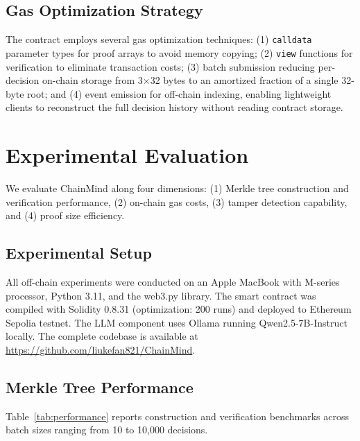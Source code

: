 \documentclass[manuscript,nonacm]{acmart}
\begin{document}
\subsection{Gas Optimization Strategy}

The contract employs several gas optimization techniques: (1) \texttt{calldata} parameter types for proof arrays to avoid memory copying; (2) \texttt{view} functions for verification to eliminate transaction costs; (3) batch submission reducing per-decision on-chain storage from 3$\times$32 bytes to an amortized fraction of a single 32-byte root; and (4) event emission for off-chain indexing, enabling lightweight clients to reconstruct the full decision history without reading contract storage.


\section{Experimental Evaluation}
\label{sec:evaluation}

We evaluate ChainMind along four dimensions: (1) Merkle tree construction and verification performance, (2) on-chain gas costs, (3) tamper detection capability, and (4) proof size efficiency.

\subsection{Experimental Setup}

All off-chain experiments were conducted on an Apple MacBook with M-series processor, Python 3.11, and the web3.py library. The smart contract was compiled with Solidity 0.8.31 (optimization: 200 runs) and deployed to Ethereum Sepolia testnet. The LLM component uses Ollama running Qwen2.5-7B-Instruct locally. The complete codebase is available at \url{https://github.com/liukefan821/ChainMind}.

\subsection{Merkle Tree Performance}

Table~\ref{tab:performance} reports construction and verification benchmarks across batch sizes ranging from 10 to 10,000 decisions.
\end{document}
